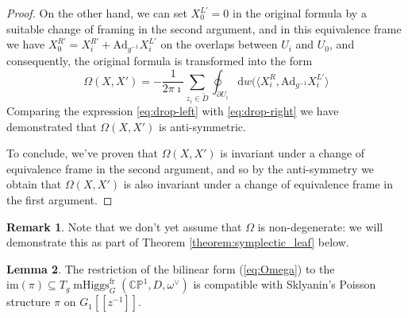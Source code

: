 \documentclass[11pt, oneside, reqno]{amsart}
\theoremstyle{definition} \newtheorem{definition}{Definition}[section]
\newtheorem{lemma}[definition]{Lemma}
\theoremstyle{definition} \newtheorem{remark}[definition]{Remark}
\theoremstyle{definition} \newtheorem{remarks}[definition]{Remarks}
\theoremstyle{definition} \newtheorem{question}[definition]{Question}
\theoremstyle{definition} \newtheorem*{note}{Note}
\theoremstyle{definition} \newtheorem{example}[definition]{Example}
\theoremstyle{definition} \newtheorem{examples}[definition]{Examples}
\newcommand{\bb}[1]{\mathbb{#1}}
\newcommand{\mr}[1]{\mathrm{#1}}
\newcommand{\sub}{\subseteq}
\DeclareMathOperator{\mhiggs}{mHiggs}
\renewcommand{\d}{\mathrm{d}}
\newcommand{\fr}{\mathrm{fr}}
\newcommand{\Ad}{\mr{Ad}}
\begin{document}
\begin{proof}
On the other hand, we can set $X_0^{L'} = 0$ in the original formula by a suitable change
of framing in the second argument, and in this equivalence frame we have $X_0^{R'} =  X_{i}^{R'}  + \Ad_{g^{-1}} X_{i}^{L'}$ on the
overlaps between $U_i$ and $U_0$, and consequently, the original formula is transformed into the form
\begin{equation}
\label{eq:drop-left}
  \Omega(X, X') =   -\frac{1}{2 \pi \imath} \sum_{z_i \in \tilde D} \oint_{\partial U_i}  \d w (
\langle  X^{R}_{i},  \Ad_{g^{-1}} X_i^{L'} \rangle 
\end{equation}
Comparing the expression \ref{eq:drop-left} with \ref{eq:drop-right} we have demonstrated that $\Omega(X,X')$ is anti-symmetric.

To conclude, we've proven that $\Omega(X,X')$ is invariant under a change of equivalence frame in the second argument, and so by the anti-symmetry we obtain that $\Omega(X, X')$ is also invariant under a change of equivalence frame in the first argument.
\end{proof}

\begin{remark}
Note that we don't yet assume that $\Omega$ is non-degenerate: we will demonstrate this as part of Theorem \ref{theorem:symplectic_leaf} below.
\end{remark}

\begin{lemma}\label{lemma:OmegaPi}
The restriction of the bilinear form (\ref{eq:Omega}) to the $\mr{im}(\pi) \sub T_g \mhiggs^\fr_G(\bb{CP}^1, D, \omega^\vee)$  is compatible with Sklyanin's Poisson structure $\pi$ on $G_1[[z^{-1}]]$.
\end{lemma}
\end{document}
